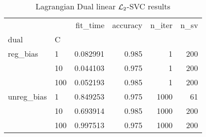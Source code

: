 \begin{table}[H]
\centering
\caption{Lagrangian Dual linear $\protect \mathcal{L}_2$-SVC results}
\label{linear_lagrangian_dual_l2_svc_cv_results}
\begin{tabular}{llrrrr}
\toprule
           &     &  fit\_time &  accuracy &  n\_iter &  n\_sv \\
dual & C &           &           &         &       \\
\midrule
reg\_bias & 1   &  0.082991 &     0.985 &       1 &   200 \\
           & 10  &  0.044103 &     0.975 &       1 &   200 \\
           & 100 &  0.052193 &     0.985 &       1 &   200 \\
unreg\_bias & 1   &  0.849253 &     0.975 &    1000 &    61 \\
           & 10  &  0.693914 &     0.985 &    1000 &   200 \\
           & 100 &  0.997513 &     0.975 &    1000 &   200 \\
\bottomrule
\end{tabular}
\end{table}
